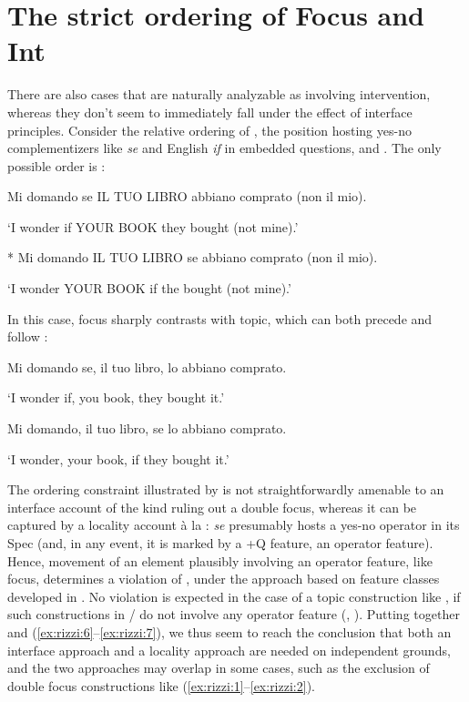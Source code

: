 \documentclass[output=paper]{LSP/langsci}
\begin{document}
\section{The strict ordering of Focus and Int}%

There are also cases that are naturally analyzable as involving intervention, whereas they don’t seem to immediately fall under the effect of interface principles. Consider the relative ordering of , the position hosting yes-no  complementizers like  \textit{se} and English \textit{if} \citep{Rizzi2001} in embedded questions, and . The only possible order is  :

\ea%
    \label{ex:rizzi:8}
\ea \label{ex:rizzi:8a}  Mi domando se IL TUO LIBRO abbiano comprato (non il mio).

 \glt ‘I wonder if YOUR BOOK they bought (not mine).'

\ex \label{ex:rizzi:8b}  * Mi domando IL TUO LIBRO se abbiano comprato (non il mio).

\glt ‘I wonder YOUR BOOK if the bought (not mine).'
\z
\z

In this case, focus sharply contrasts with topic, which can both precede and follow :

\ea%
    \label{ex:rizzi:9}
\ea  \label{ex:rizzi:9a}  Mi domando se, il tuo libro, lo abbiano comprato.

 \glt ‘I wonder if, you book, they bought it.’

\ex \label{ex:rizzi:9b}  Mi domando, il tuo libro, se lo abbiano comprato.

\glt ‘I wonder, your book, if they bought it.’
\z
\z

The ordering constraint illustrated by  is not straightforwardly amenable to an interface account of the kind ruling out a double focus, whereas it can be captured by a locality account à la \citet{Abels2012}: \textit{se} presumably hosts a yes-no operator in its Spec (and, in any event, it is marked by a +Q feature, an operator feature). Hence, movement of an element plausibly involving an operator feature, like focus, determines a violation of , under the approach based on feature classes developed in \citet{Rizzi2004}. No violation is expected in the case of a topic construction like , if such constructions  in / do not involve any operator feature (\citealt{Cinque1990}, \citealt{Rizzi2004}). Putting together  and (\ref{ex:rizzi:6}--\ref{ex:rizzi:7}), we thus seem to reach the conclusion that both an interface approach and a locality approach are needed on independent grounds, and the two approaches may overlap in some cases, such as the exclusion of double focus constructions like (\ref{ex:rizzi:1}--\ref{ex:rizzi:2}).
\end{document}
